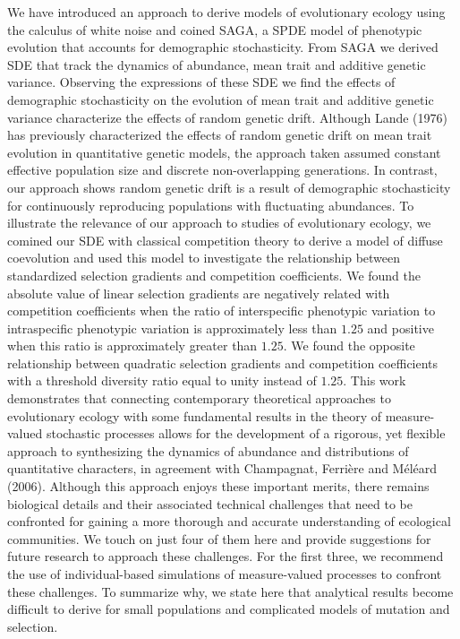 \documentclass[]{article}
\begin{document}
We have introduced an approach to derive models of evolutionary ecology
using the calculus of white noise and coined SAGA, a SPDE model of
phenotypic evolution that accounts for demographic stochasticity. From
SAGA we derived SDE that track the dynamics of abundance, mean trait and
additive genetic variance. Observing the expressions of these SDE we
find the effects of demographic stochasticity on the evolution of mean
trait and additive genetic variance characterize the effects of random
genetic drift. Although Lande (1976) has previously characterized the
effects of random genetic drift on mean trait evolution in quantitative
genetic models, the approach taken assumed constant effective population
size and discrete non-overlapping generations. In contrast, our approach
shows random genetic drift is a result of demographic stochasticity for
continuously reproducing populations with fluctuating abundances. To
illustrate the relevance of our approach to studies of evolutionary
ecology, we comined our SDE with classical competition theory to derive
a model of diffuse coevolution and used this model to investigate the
relationship between standardized selection gradients and competition
coefficients. We found the absolute value of linear selection gradients
are negatively related with competition coefficients when the ratio of
interspecific phenotypic variation to intraspecific phenotypic variation
is approximately less than \(1.25\) and positive when this ratio is
approximately greater than \(1.25\). We found the opposite relationship
between quadratic selection gradients and competition coefficients with
a threshold diversity ratio equal to unity instead of \(1.25\). This
work demonstrates that connecting contemporary theoretical approaches to
evolutionary ecology with some fundamental results in the theory of
measure-valued stochastic processes allows for the development of a
rigorous, yet flexible approach to synthesizing the dynamics of
abundance and distributions of quantitative characters, in agreement
with Champagnat, Ferrière and Méléard (2006). Although this approach
enjoys these important merits, there remains biological details and
their associated technical challenges that need to be confronted for
gaining a more thorough and accurate understanding of ecological
communities. We touch on just four of them here and provide suggestions
for future research to approach these challenges. For the first three,
we recommend the use of individual-based simulations of measure-valued
processes to confront these challenges. To summarize why, we state here
that analytical results become difficult to derive for small populations
and complicated models of mutation and selection.
\end{document}
